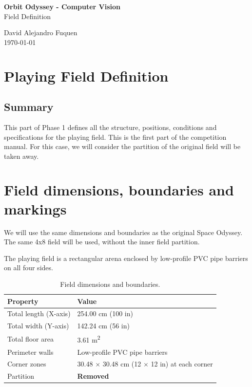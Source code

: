 \documentclass[a4]{article}
\begin{document}
\thispagestyle{fancy}

\begin{center}
    \textbf{\large Orbit Odyssey - Computer Vision} \\
    {Field Definition}
    
    \vspace{0.7em}

    David Alejandro Fuquen \\

    {\small \today}

\end{center}

\section*{Playing Field Definition}

\subsection*{Summary}
This part of Phase 1 defines all the structure, positions, conditions and specifications for the playing field. This is the first part of the competition manual. For this case, we will consider the partition of the original field will be taken away. 


\section*{Field dimensions, boundaries and markings}
We will use the same dimensions and boundaries as the original Space Odyssey. The same 4x8 field will be used, without the inner field partition. 

The playing field is a rectangular arena enclosed by low-profile PVC pipe barriers on all four sides.

\begin{table}[H]
\centering
\begin{tabular}{ll}
\toprule
\textbf{Property} & \textbf{Value} \\
\midrule
Total length (X-axis) & 254.00 cm (100 in) \\
Total width (Y-axis) & 142.24 cm (56 in) \\
Total floor area & 3.61 m\textsuperscript{2} \\
Perimeter walls & Low-profile PVC pipe barriers \\
Corner zones & 30.48 $\times$ 30.48 cm (12 $\times$ 12 in) at each corner \\
Partition & \textbf{Removed} \\
\bottomrule
\end{tabular}
\caption{Field dimensions and boundaries.}
\end{table}
\end{document}

